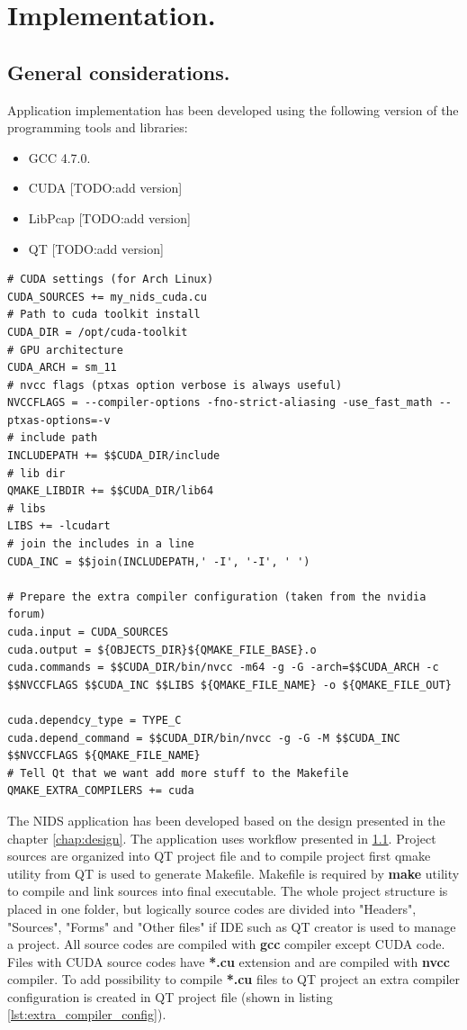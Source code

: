 \documentclass[thesis=M,english]{FITthesis}[2011/07/15]
\begin{document}
\chapter{Implementation.}
\section{General considerations.}
Application implementation has been developed using the following version of the programming tools and libraries:
\begin{itemize}
\item GCC 4.7.0.
\item CUDA [TODO:add version]
\item LibPcap [TODO:add version]
\item QT [TODO:add version]
\end{itemize}

\begin{lstlisting}
# CUDA settings (for Arch Linux)
CUDA_SOURCES += my_nids_cuda.cu
# Path to cuda toolkit install
CUDA_DIR = /opt/cuda-toolkit
# GPU architecture
CUDA_ARCH = sm_11
# nvcc flags (ptxas option verbose is always useful)
NVCCFLAGS = --compiler-options -fno-strict-aliasing -use_fast_math --ptxas-options=-v
# include path
INCLUDEPATH += $$CUDA_DIR/include
# lib dir
QMAKE_LIBDIR += $$CUDA_DIR/lib64
# libs
LIBS += -lcudart
# join the includes in a line
CUDA_INC = $$join(INCLUDEPATH,' -I', '-I', ' ')

# Prepare the extra compiler configuration (taken from the nvidia forum)
cuda.input = CUDA_SOURCES
cuda.output = ${OBJECTS_DIR}${QMAKE_FILE_BASE}.o
cuda.commands = $$CUDA_DIR/bin/nvcc -m64 -g -G -arch=$$CUDA_ARCH -c $$NVCCFLAGS $$CUDA_INC $$LIBS ${QMAKE_FILE_NAME} -o ${QMAKE_FILE_OUT}

cuda.dependcy_type = TYPE_C
cuda.depend_command = $$CUDA_DIR/bin/nvcc -g -G -M $$CUDA_INC $$NVCCFLAGS ${QMAKE_FILE_NAME}
# Tell Qt that we want add more stuff to the Makefile
QMAKE_EXTRA_COMPILERS += cuda
\end{lstlisting}

The NIDS application has been developed based on the design presented in the chapter \ref{chap:design}. The application uses workflow presented in \ref{}. Project sources are organized into QT project file and to compile project first qmake utility from QT is used to generate Makefile. Makefile is required by \textbf{make } utility to compile and link sources into final executable. The whole project structure is placed in one folder, but logically source codes are divided into "Headers", "Sources", "Forms" and "Other files" if IDE such as QT creator is used to manage a project. All source codes are compiled with \textbf{gcc} compiler except CUDA code. Files with CUDA source codes have \textbf{*.cu} extension and are compiled with \textbf{nvcc} compiler. To add possibility to compile \textbf{*.cu} files to QT project an extra compiler configuration is created in QT project file (shown in listing \ref{lst:extra_compiler_config}).
\end{document}
